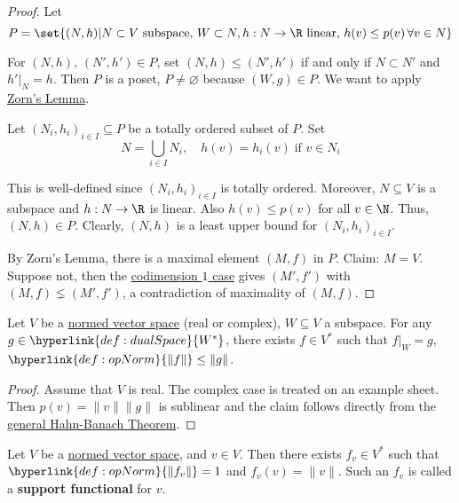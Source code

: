 \documentclass{article}
\renewcommand{\emptyset}{\varnothing}
\begin{document}
\begin{proof}
    Let
    \begin{equation*}
        P = \set{(N, h) | N \subset V \text{ subspace}, \, W \subset N, h: N \to \R \text{ linear}, \, h(v) \leq p(v) \, \forall v \in N}
    \end{equation*}

    For $(N, h), \, (N', h') \in P$, set $(N, h) \leq (N', h')$ if and only if $N \subset N'$ and $h' |_N = h$.
    Then $P$ is a poset, $P \neq \emptyset$ because $(W, g) \in P$. We want to apply \hyperlink{lem:zorn}{Zorn's Lemma}.

    Let $(N_i, h_i)_{i \in I} \subseteq P$ be a totally ordered subset of $P$. Set
    \begin{equation*}
        N = \bigcup_{i \in I} N_i, \quad h(v) = h_i(v) \; \text{if } v \in N_i
    \end{equation*}

    This is well-defined since $(N_i, h_i)_{i \in I}$ is totally ordered. Moreover, $N \subseteq V$ is a subspace and $h: N \to \R$ is linear. Also $h(v) \leq p(v)$ for all $v \in \N$. Thus, $(N, h) \in P$. Clearly, $(N, h)$ is a least upper bound for $(N_i, h_i)_{i \in I}$.

    By Zorn's Lemma, there is a maximal element $(M, f)$ in $P$.
    Claim: $M=V$.
    Suppose not, then the \hyperlink{lem:smallHahn}{codimension $1$ case} gives $(M', f')$ with $(M, f) \lneq (M', f')$, a contradiction of maximality of $(M, f)$.
\end{proof}

\begin{cor}
    Let $V$ be a \hyperlink{def:nvs}{normed vector space} (real or complex), $W \subseteq V$ a subspace.
    For any $g \in \hyperlink{def:dualSpace}{W^*}$, there exists $f \in V^*$ such that $f |_W = g$, $\hyperlink{def:opNorm}{\|f\|} \leq \|g\|$.
\end{cor}

\begin{proof}
    Assume that $V$ is real. The complex case is treated on an example sheet.
    Then $p(v) = \|v\| \|g\|$ is sublinear and the claim follows directly from the \hyperlink{thm:hahnBanach}{general Hahn-Banach Theorem}.
\end{proof}

\begin{cor}
    Let $V$ be a \hyperlink{def:nvs}{normed vector space}, and $v \in V$.
    Then there exists $f_v \in V^*$ such that $\hyperlink{def:opNorm}{\|f_v\|} = 1$ and $f_v(v) = \|v\|$.
    Such an $f_v$ is called a \textbf{support functional} for $v$.
\end{cor}
\end{document}
